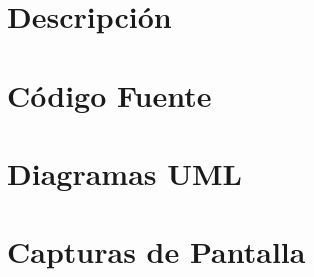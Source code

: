 \documentclass[12pt]{article}
\begin{document}
\section{Descripción}


\section{Código Fuente}


\section{Diagramas UML}


\section{Capturas de Pantalla}




%
%
\end{document}
